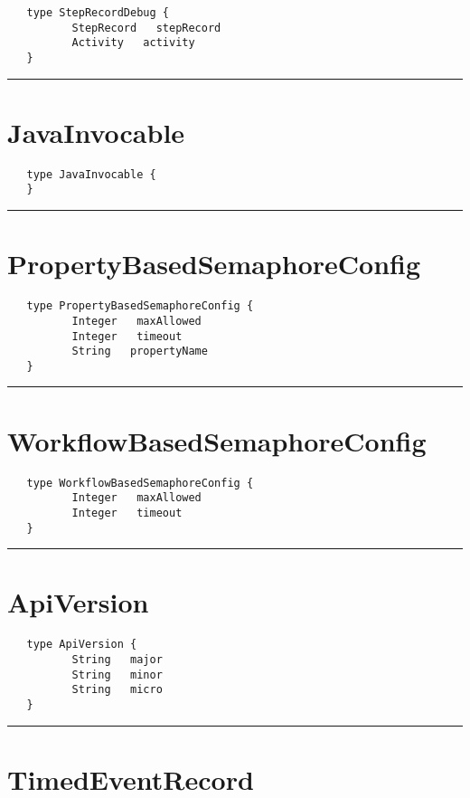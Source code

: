 \begin{Verbatim}
   type StepRecordDebug {
          StepRecord   stepRecord
          Activity   activity
   }
\end{Verbatim}

\rule{12cm}{2pt}
\section{JavaInvocable}
\label{type:JavaInvocable}

\begin{Verbatim}
   type JavaInvocable {
   }
\end{Verbatim}

\rule{12cm}{2pt}
\section{PropertyBasedSemaphoreConfig}
\label{type:PropertyBasedSemaphoreConfig}

\begin{Verbatim}
   type PropertyBasedSemaphoreConfig {
          Integer   maxAllowed
          Integer   timeout
          String   propertyName
   }
\end{Verbatim}

\rule{12cm}{2pt}
\section{WorkflowBasedSemaphoreConfig}
\label{type:WorkflowBasedSemaphoreConfig}

\begin{Verbatim}
   type WorkflowBasedSemaphoreConfig {
          Integer   maxAllowed
          Integer   timeout
   }
\end{Verbatim}

\rule{12cm}{2pt}
\section{ApiVersion}
\label{type:ApiVersion}

\begin{Verbatim}
   type ApiVersion {
          String   major
          String   minor
          String   micro
   }
\end{Verbatim}

\rule{12cm}{2pt}
\section{TimedEventRecord}
\label{type:TimedEventRecord}

